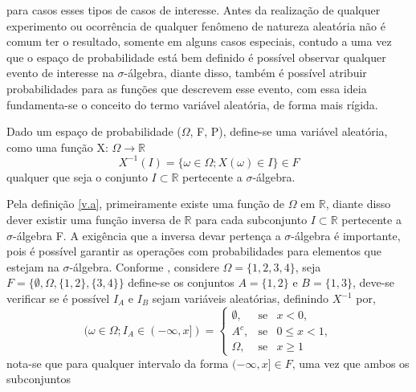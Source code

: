 	para casos esses tipos de casos de interesse. Antes da realiza\c{c}\~{a}o de qualquer experimento ou ocorr\^{e}ncia de qualquer
	fen\^{o}meno de natureza aleat\'{o}ria n\~{a}o \'{e} comum ter o resultado, somente em alguns casos especiais, contudo a 
	uma vez que o espa\c{c}o de probabilidade est\'{a} bem definido \'{e} poss\'{i}vel observar qualquer evento de interesse na 
	$\sigma$-\'{a}lgebra, diante disso, tamb\'{e}m \'{e} poss\'{i}vel atribuir probabilidades para as fun\c{c}\~{o}es que descrevem
	esse evento, com essa ideia fundamenta-se o conceito do termo vari\'{a}vel aleat\'{o}ria, de forma mais r\'{i}gida.
	\begin{defin}
	  Dado um espa\c{c}o de probabilidade ($\Omega$, F, P), define-se uma vari\'{a}vel aleat\'{o}ria, como uma fun\c{c}\~{a}o
	  X: $\Omega \rightarrow \mathbb{R}$
	  \begin{equation*}
		X^{-1}(I) = \{ \omega \in \Omega; X(\omega) \in I \} \in F
	  \end{equation*}
	  \label{v.a}
	  qualquer que seja o conjunto $I \subset \mathbb{R}$ pertecente a $\sigma$-\'{a}lgebra.
	\end{defin}
	Pela defini\c{c}\~{a}o \ref{v.a}, primeiramente existe uma fun\c{c}\~{a}o de $\Omega$ em $\mathbb{R}$, diante disso dever existir uma
	fun\c{c}\~{a}o inversa de $\mathbb{R}$ para cada subconjunto $I \subset \mathbb{R}$ pertecente a $\sigma$-\'{a}lgebra F. A exig\^{e}ncia
	que a inversa devar perten\c{c}a a $\sigma$-\'{a}lgebra \'{e} importante, pois \'{e} poss\'{i}vel garantir as opera\c{c}\~{o}es com 
	probabilidades para elementos que estejam na $\sigma$-\'{a}lgebra. Conforme \cite{magalhaes}, considere $\Omega = \{1,2,3,4 \}$, seja 
	$ F = \{ \emptyset, \Omega, \{1,2 \}, \{3,4 \} \} $  define-se os conjuntos $A = \{1,2 \}$ e $B = \{1,3 \}$, deve-se verificar se 
	\'{e} poss\'{i}vel $I_A$ e $I_B$ sejam vari\'{a}veis aleat\'{o}rias, definindo $X^{-1}$ por,
	\begin{equation*}
	( \omega \in \Omega; I_{A} \in (-\infty, x]) = \left\{
	  \begin{array}{lcl}
		\emptyset, & \mbox {se} &  x <  0, \\
	    A^{c},     & \mbox {se} &  0 \leq x < 1, \\ 
		\Omega,    & \mbox {se} &  x \geq 1 
	  \end{array}
	\right.
	\end{equation*}
  nota-se que para qualquer intervalo da forma  $ (-\infty, x ] \in F $, uma vez que  ambos os subconjuntos
